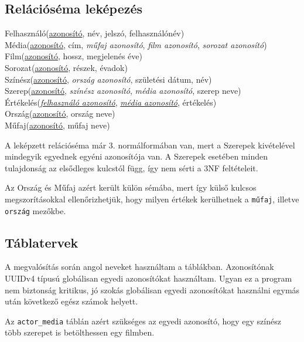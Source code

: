 \documentclass[12pt,a4paper,titlepage]{article}  %
\begin{document}
\subsection{Relációséma leképezés}

\noindent Felhasználó(\underline{azonosító}, név, jelszó, felhasználónév) \\
Média(\underline{azonosító}, cím, \textit{műfaj azonosító}, \textit{film azonosító}, \textit{sorozat azonosító}) \\
Film(\underline{azonosító}, hossz, megjelenés éve) \\
Sorozat(\underline{azonosító}, részek, évadok) \\
Színész(\underline{azonosító}, \textit{ország azonosító}, születési dátum, név) \\
Szerep(\underline{azonosító}, \textit{színész azonosító}, \textit{média azonosító}, szerep neve) \\
Értékelés(\underline{\textit{felhasználó azonosító}}, \underline{\textit{média azonosító}}, értékelés) \\
Ország(\underline{azonosító}, ország neve) \\
Műfaj(\underline{azonosító}, műfaj neve)

\bigskip

A leképzett relációséma már 3. normálformában van, mert a Szerepek kivételével mindegyik egyednek egyéni azonosítója van. A Szerepek esetében minden tulajdonság az elsődleges kulcstól függ, így nem sérti a 3NF feltételeit.

\bigskip

Az Ország és Műfaj azért került külön sémába, mert így külső kulcsos megszorításokkal ellenőrizhetjük, hogy milyen értékek kerülhetnek a \texttt{műfaj}, illetve \texttt{ország} mezőkbe.

\subsection{Táblatervek}

A megvalósítás során angol neveket használtam a táblákban. Azonosítónak UUIDv4 típusú globálisan egyedi azonosítókat használtam. Ugyan ez a program nem biztonság kritikus, jó szokás globálisan egyedi azonosítókat használni egymás után következő egész számok helyett.

Az \texttt{actor\_media} táblán azért szükséges az egyedi azonosító, hogy egy színész több szerepet is betölthessen egy filmben.
\end{document}
